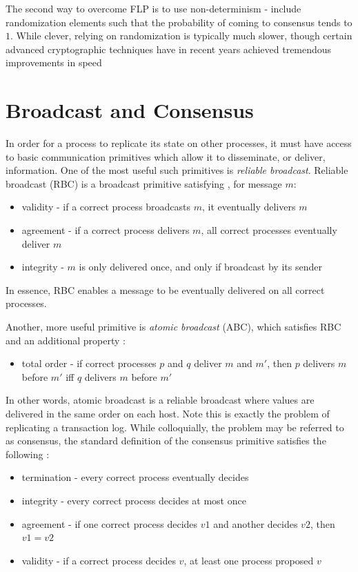 The second way to overcome FLP is to use non-determinism - 
include randomization elements such that
the probability of coming to consensus tends to $1$.
While clever, relying on randomization is typically much slower, 
though certain advanced cryptographic techniques have in recent years
achieved tremendous improvements in speed \cite{honeybadger}


\section{Broadcast and Consensus}

In order for a process to replicate its state on other processes, 
it must have access to basic communication primitives which allow it to disseminate, or deliver, information.
One of the most useful such primitives is \emph{reliable broadcast}.
Reliable broadcast (RBC) is a broadcast primitive satisfying \cite{chandra1996unreliable}, for message $m$:

\begin{itemize}
\item validity - if a correct process broadcasts $m$, it eventually delivers $m$
\item agreement - if a correct process delivers $m$, all correct processes eventually deliver $m$
\item integrity - $m$ is only delivered once, and only if broadcast by its sender
\end{itemize}

In essence, RBC enables a message to be eventually delivered on all correct processes.

Another, more useful primitive is \emph{atomic broadcast} (ABC), 
which satisfies RBC and an additional property \cite{chandra1996unreliable}:

\begin{itemize}
\item total order - if correct processes $p$ and $q$ deliver $m$ and $m'$, then $p$ delivers $m$ before $m'$ iff $q$ delivers $m$ before $m'$
\end{itemize}

In other words, atomic broadcast is a reliable broadcast where values are delivered in the same order on each host. 
Note this is exactly the problem of replicating a transaction log.
While colloquially, the problem may be referred to as consensus, 
the standard definition of the consensus primitive satisfies the following \cite{chandra1996unreliable}:
\begin{itemize}
\item termination - every correct process eventually decides
\item integrity - every correct process decides at most once
\item agreement - if one correct process decides $v1$ and another decides $v2$, then $v1=v2$
\item validity - if a correct process decides $v$, at least one process proposed $v$
\end{itemize}

